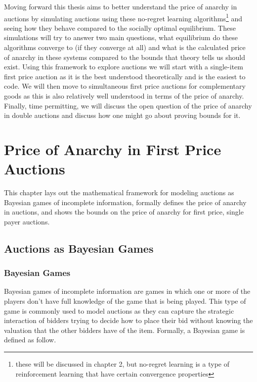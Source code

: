 \documentclass[12pt,twoside]{reedthesis}
\begin{document}
Moving forward this thesis aims to better understand the price of anarchy in auctions by simulating auctions using these no-regret learning algorithms\footnote{these will be discussed in chapter 2, but no-regret learning is a type of reinforcement learning that have certain convergence properties} and seeing how they behave compared to the socially optimal equilibrium. These simulations will try to answer two main questions, what equilibrium do these algorithms converge to (if they converge at all) and what is the calculated price of anarchy in these systems compared to the bounds that theory tells us should exist. Using this framework to explore auctions we will start with a single-item first price auction as it is the best understood theoretically and is the easiest to code. We will then move to simultaneous first price auctions for complementary goods as this is also relatively well understood in terms of the price of anarchy. Finally, time permitting, we will discuss the open question of the price of anarchy in double auctions and discuss how one might go about proving bounds for it.

\chapter{Price of Anarchy in First Price Auctions}
This chapter lays out the mathematical framework for modeling auctions as Bayesian games of incomplete information, formally defines the price of anarchy in auctions, and shows the bounds on the price of anarchy for first price, single payer auctions.

\section{Auctions as Bayesian Games}

\subsection{Bayesian Games}
Bayesian games of incomplete information are games in which one or more of the players don't have full knowledge of the game that is being played. This type of game is commonly used to model auctions as they can capture the strategic interaction of bidders trying to decide how to place their bid without knowing the valuation that the other bidders have of the item. Formally, a Bayesian game is defined as follow.
\end{document}

